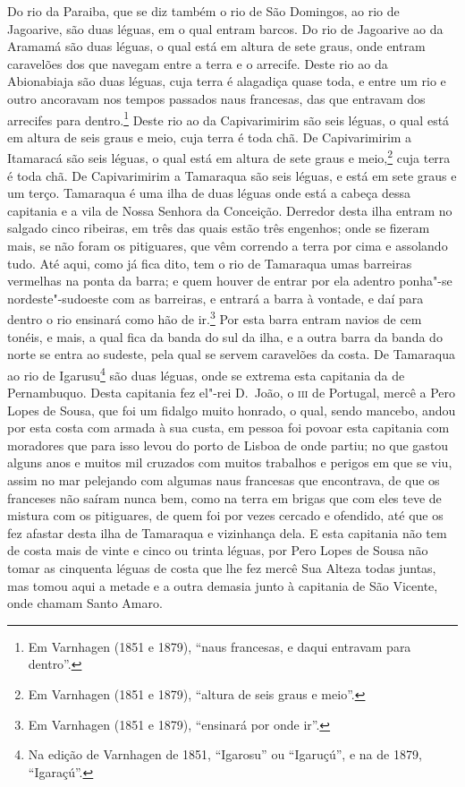 Do rio da Paraiba, que se diz também o rio de São Domingos, ao rio de Jagoarive, são duas
léguas, em o qual entram barcos. Do rio de Jagoarive ao da Aramamá são duas léguas, o qual
está em altura de sete graus, onde entram caravelões dos que navegam entre a terra e o
arrecife. Deste rio ao da Abionabiaja são duas léguas, cuja terra é alagadiça quase toda,
e entre um rio e outro ancoravam nos tempos passados naus francesas, das que entravam dos
arrecifes para dentro.\footnote{ Em Varnhagen (1851 e 1879), ``naus francesas, e daqui
entravam para dentro''.} Deste rio ao da Capivarimirim são seis léguas, o qual está em
altura de seis graus e meio, cuja terra é toda chã. De Capivarimirim a Itamaracá são seis
léguas, o qual está em altura de sete graus e meio,\footnote{ Em Varnhagen (1851 e 1879),
``altura de seis graus e meio''.} cuja terra é toda chã. De Capivarimirim a Tamaraqua são
seis léguas, e está em sete graus e um terço. Tamaraqua é uma ilha de duas léguas onde
está a cabeça dessa capitania e a vila de Nossa Senhora da Conceição. Derredor desta ilha
entram no salgado cinco ribeiras, em três das quais estão três engenhos; onde se fizeram
mais, se não foram os pitiguares, que vêm correndo a terra por cima e assolando tudo. Até
aqui, como já fica dito, tem o rio de Tamaraqua umas barreiras vermelhas na ponta da
barra; e quem houver de entrar por ela adentro ponha"-se nordeste"-sudoeste com as
barreiras, e entrará a barra à vontade, e daí para dentro o rio ensinará como hão de
ir.\footnote{ Em Varnhagen (1851 e 1879), ``ensinará por onde ir''.} Por esta barra entram
navios de cem tonéis, e mais, a qual fica da banda do sul da ilha, e a outra barra da
banda do norte se entra ao sudeste, pela qual se servem caravelões da costa. De Tamaraqua
ao rio de Igarusu\footnote{ Na edição de Varnhagen de 1851, ``Igarosu'' ou ``Igaruçú'', e
na de 1879, ``Igaraçú''.} são duas léguas, onde se extrema esta capitania da de
Pernambuquo. Desta capitania fez el"-rei D.~João, o \textsc{iii} de Portugal, mercê a Pero
Lopes de Sousa, que foi um fidalgo muito honrado, o qual, sendo mancebo, andou por esta
costa com armada à sua custa, em pessoa foi povoar esta capitania com moradores que para
isso levou do porto de Lisboa de onde partiu; no que gastou alguns anos e muitos mil
cruzados com muitos trabalhos e perigos em que se viu, assim no mar pelejando com algumas
naus francesas que encontrava, de que os franceses não saíram nunca bem, como na terra em
brigas que com eles teve de mistura com os pitiguares, de quem foi por vezes cercado e
ofendido, até que os fez afastar desta ilha de Tamaraqua e vizinhança dela. E esta
capitania não tem de costa mais de vinte e cinco ou trinta léguas, por Pero Lopes de Sousa
não tomar as cinquenta léguas de costa que lhe fez mercê Sua Alteza todas juntas, mas
tomou aqui a metade e a outra demasia junto à capitania de São Vicente, onde chamam Santo
Amaro.


